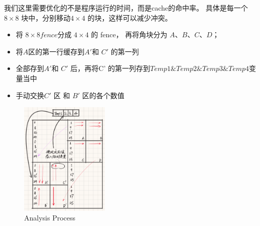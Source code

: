 我们这里需要优化的不是程序运行的时间，而是cache的命中率。
具体是每一个$8 \times 8 $ 块中，分别移动$4 \times 4$ 的块，这样可以减少冲突。

\begin{itemize}
    \item 将 $ 8 \times 8  fence $分成 $ 4 \times 4 $ 的 fence， 再将角块分为 $ A、 B 、C、D$；
    \item 将$A $区的第一行缓存到$A' $和 $C'$ 的第一列
    \item 全部存到$ A' $和 $C'$ 后，再将C' 的第一列存到$ Temp1 \& Temp2 \& Temp3 \& Temp4 $变量当中
    \item 手动交换$C'$ 区 和 $B'$ 区的各个数值
\end{itemize}

\begin{figure} [H]
    \centering
    \includegraphics[width=0.38\textwidth]{Analy.png}
    \caption{Analysis Process}
\end{figure}


